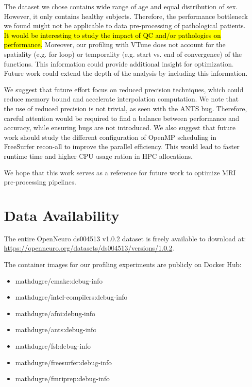 \documentclass[conference]{IEEEtran}
\newcommand{\HL}[1]{\hl{#1}}
\begin{document}
The dataset we chose contains wide range of age and equal distribution of sex. However, it only contains healthy subjects. Therefore, the performance bottleneck we found might not be applicable to data pre-processing of pathological patients. \HL{It would be interesting to study the impact of QC and/or pathologies on performance.} Moreover, our profiling with VTune does not account for the spatiality (e.g. for loop) or temporality (e.g. start vs. end of convergence) of the functions. This information could provide additional insight for optimization. Future work could extend the depth of the analysis by including this information.

We suggest that future effort focus on reduced precision techniques, which could reduce memory bound and accelerate interpolation computation. We note that the use of reduced precision is not trivial, as seen with the ANTS bug. Therefore, careful attention would be required to find a balance between performance and accuracy, while ensuring bugs are not introduced. We also suggest that future work should study the different configuration of OpenMP scheduling in FreeSurfer recon-all to improve the parallel efficiency. This would lead to faster runtime time and higher CPU usage ration in HPC allocations.

We hope that this work serves as a reference for future work to optimize MRI pre-processing pipelines. 
			
			
\section{Data Availability}
\label{sec:data-availability}
The entire OpenNeuro ds004513 v1.0.2 dataset is freely available to download at:
\\\href{https://openneuro.org/datasets/ds004513/versions/1.0.2}{https://openneuro.org/datasets/ds004513/versions/1.0.2}.
	
The container images for our profiling experiments are publicly on Docker Hub:
\begin{itemize}
	\item mathdugre/cmake:debug-info
	\item mathdugre/intel-compilers:debug-info
	\item mathdugre/afni:debug-info
	\item mathdugre/ants:debug-info
	\item mathdugre/fsl:debug-info
	\item mathdugre/freesurfer:debug-info
	\item mathdugre/fmriprep:debug-info
\end{itemize}
	
\end{document}
